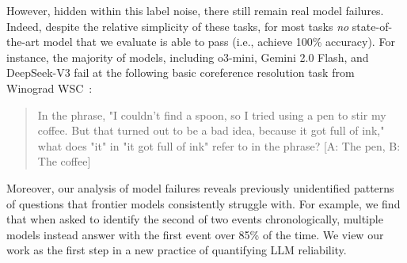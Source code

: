 However, hidden within this label noise, there still remain real model failures.
Indeed, despite the relative simplicity of these tasks, 
for most tasks {\em no} state-of-the-art model that we evaluate is able to pass (i.e., achieve 100\% accuracy). 
For instance, the majority of models, including o3-mini, Gemini 2.0 Flash, and DeepSeek-V3 fail at the following basic coreference resolution task from Winograd WSC~\citep{levesque2012winograd}:

\begin{quote}
\small
In the phrase, "I couldn't find a spoon, so I tried using a pen to stir my coffee. But that turned out to be a bad idea, because it got full of ink," what does "it" in "it got full of ink" refer to in the phrase? [A: The pen,  B: The coffee]
\end{quote}

\noindent
Moreover, our analysis of model failures reveals previously unidentified patterns of questions that frontier models consistently struggle with. For example, we find that when asked to identify the second of two events chronologically, multiple models instead answer with the first event over 85\% of the time.
We view our work as the first step in a new practice of quantifying LLM reliability.











